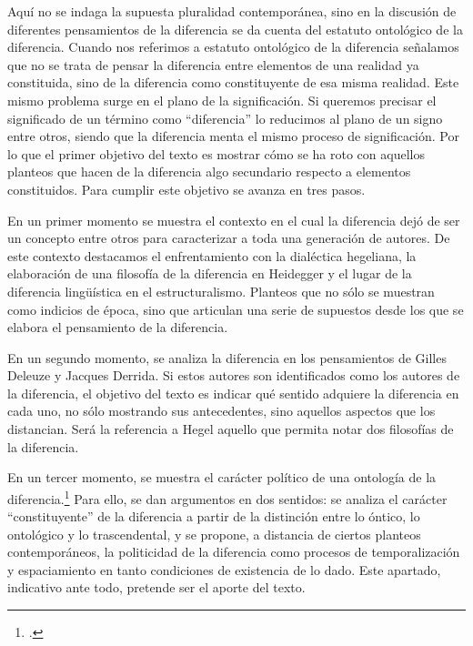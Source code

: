 Aquí no se indaga la supuesta pluralidad contemporánea, sino en la discusión de diferentes pensamientos de la diferencia se da cuenta del estatuto ontológico de la diferencia. Cuando nos referimos a estatuto ontológico de la diferencia señalamos que no se trata de pensar la diferencia entre elementos de una realidad ya constituida, sino de la diferencia como constituyente de esa misma realidad. Este mismo problema surge en el plano de la significación. Si queremos precisar el significado de un término como \enquote{diferencia} lo reducimos al plano de un signo entre otros, siendo que la diferencia menta el mismo proceso de significación. Por lo que el primer objetivo del texto es mostrar cómo se ha roto con aquellos planteos que hacen de la diferencia algo secundario respecto a elementos constituidos. Para cumplir este objetivo se avanza en tres pasos.

En un primer momento se muestra el contexto en el cual la diferencia dejó de ser un concepto entre otros para caracterizar a toda una generación de autores. De este contexto destacamos el enfrentamiento con la dialéctica hegeliana, la elaboración de una filosofía de la diferencia en Heidegger y el lugar de la diferencia lingüística en el estructuralismo. Planteos que no sólo se muestran como indicios de época, sino que articulan una serie de supuestos desde los que se elabora el pensamiento de la diferencia.

En un segundo momento, se analiza la diferencia en los pensamientos de Gilles Deleuze y Jacques Derrida. Si estos autores son identificados como los autores de la diferencia, el objetivo del texto es indicar qué sentido adquiere la diferencia en cada uno, no sólo mostrando sus antecedentes, sino aquellos aspectos que los distancian. Será la referencia a Hegel aquello que permita notar dos filosofías de la diferencia.

En un tercer momento, se muestra el carácter político de una ontología de la diferencia.\footcite[\emph{Ontología diferencial} es el título de una propuesta reciente de Miguel de Beistegui que cruza los planteos de Heidegger y Deleuze para elaborar una filosofía que escape a su fragmentación. Aquí, a diferencia de Beistegui, se trata de pensar desde una perspectiva política esta ontología diferencial. Véase][]{@6960-BEISTEGUI2004} Para ello, se dan argumentos en dos sentidos: se analiza el carácter \enquote{constituyente} de la diferencia a partir de la distinción entre lo óntico, lo ontológico y lo trascendental, y se propone, a distancia de ciertos planteos contemporáneos, la politicidad de la diferencia como procesos de temporalización y espaciamiento en tanto condiciones de existencia de lo dado. Este apartado, indicativo ante todo, pretende ser el aporte del texto.

